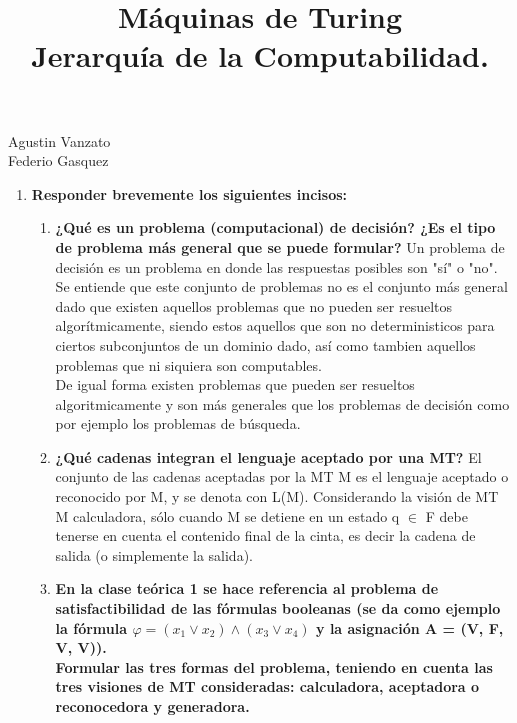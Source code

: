 \documentclass{article}
\title{Máquinas de Turing \\ Jerarquía de la Computabilidad.}
\begin{document}
\newenvironment{solution}{\begin{proof}[Solution]}{\end{proof}}
\maketitle

\large 

\begin{center}

{\Large Agustin Vanzato \\
Federio Gasquez} %
\end{center}
\vspace{0.05in}

\begin{enumerate}

\item \textbf{ Responder brevemente los siguientes incisos:}

\begin{enumerate}
\item \textbf{¿Qué es un problema (computacional) de decisión? ¿Es el tipo de problema más general que se puede formular?}
Un problema de decisión es un problema en donde las respuestas posibles son "sí" o "no".\\
Se entiende que este conjunto de problemas no es el conjunto más general dado que
existen aquellos problemas que no pueden ser resueltos algorítmicamente, siendo
estos aquellos que son no deterministicos para ciertos subconjuntos de un dominio
dado, así como tambien aquellos problemas que ni siquiera son computables.
\\De igual forma existen problemas que pueden ser resueltos algoritmicamente y son
más generales que los problemas de decisión como por ejemplo los problemas de
búsqueda.
\item \textbf{¿Qué cadenas integran el lenguaje aceptado por una MT?}
El conjunto de las cadenas aceptadas por la MT M es el lenguaje aceptado o reconocido por M, y se denota con L(M). Considerando la visión de
MT M calculadora, sólo cuando M se detiene en un estado q $\in$ F debe tenerse en cuenta
el contenido final de la cinta, es decir la cadena de salida (o simplemente la salida).
\item \textbf{En la clase teórica 1 se hace referencia al problema de satisfactibilidad de las fórmulas booleanas (se da como ejemplo la fórmula $\varphi = (x_1 \vee x_2) \wedge (x_3 \vee x_4)$ y la asignación A = (V, F, V, V)).\\ Formular las tres formas del problema, teniendo en cuenta las tres visiones de MT consideradas: calculadora, aceptadora o reconocedora y generadora.}



\end{enumerate}
\end{enumerate}
\end{document}
